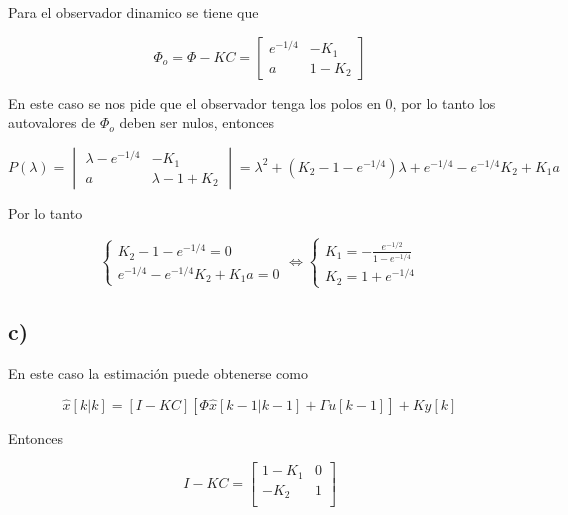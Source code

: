\documentclass[11pt,a4paper]{article}
\newcommand{\siseq}[1]{ \left\{ \begin{array}{c}
    #1
\end{array} \right. }
\begin{document}
    Para el observador dinamico se tiene que 
    
    \begin{equation}
        \Phi_o = \Phi - KC = 
        \begin{bmatrix}
            e^{-1/4} & -K_1 \\
            a & 1 - K_2
        \end{bmatrix}
    \end{equation}

    En este caso se nos pide que el observador tenga los polos en $0$, por lo tanto 
    los autovalores de $\Phi_o$ deben ser nulos, entonces
    
    \begin{equation}
        P(\lambda) = 
        \begin{vmatrix}
            \lambda - e^{-1/4} & -K_1 \\
            a & \lambda - 1 + K_2
        \end{vmatrix} = 
        \lambda ^ 2 + ( K_2 - 1 - e^{-1/4}) \lambda +e^{-1/4} - e^{-1/4}K_2 + K_1a
    \end{equation}

    Por lo tanto 
    
    \begin{equation}
        \siseq{
        K_2 - 1 - e^{-1/4} = 0 \\ 
        e^{-1/4} - e^{-1/4}K_2 + K_1a = 0
        }
        \Leftrightarrow
        \siseq{
            K_1 = - \frac{e^{-1/2}}{1 - e^{-1/4}} \\
            K_2 = 1 + e^{-1/4}
        }
    \end{equation}

    \subsection*{c)}

    En este caso la estimación puede obtenerse como 

    \begin{equation}
        \hat{x}[k|k] = 
        [I - KC][ \Phi \hat{x}[k-1|k-1] + \Gamma u[k-1] ] + Ky[k]
    \end{equation}

    Entonces

    \begin{equation}
        I - KC = \begin{bmatrix}
            1 - K_1 & 0 \\
            -K_2 & 1 \\
        \end{bmatrix}
    \end{equation}
\end{document}
